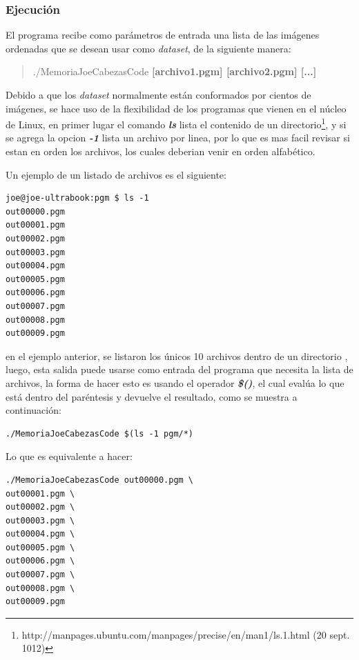 \subsubsection{Ejecución}
\label{ch:propuesta:sec:extraccionDeLaSuperficie:subsec:ejecucion}

El programa recibe como parámetros de entrada una lista de las imágenes ordenadas que se desean usar como \emph{dataset}, de la siguiente manera:

\begin{quote}
./MemoriaJoeCabezasCode \textbf{[archivo1.pgm] [archivo2.pgm] [...]}
\end{quote}

Debido a que los \emph{dataset} normalmente están conformados por cientos de imágenes, se hace uso de la flexibilidad de los programas que vienen en el núcleo de Linux, en primer lugar el comando \textbf{\emph{ls}} lista el contenido de un directorio\footnote{http://manpages.ubuntu.com/manpages/precise/en/man1/ls.1.html (20 sept. 1012)}, y si se agrega la opcion \textbf{\emph{-1}} lista un archivo por linea, por lo que es mas facil revisar si estan en orden los archivos, los cuales deberian venir en orden alfabético.

Un ejemplo de un listado de archivos es el siguiente:

\begin{verbatim}
joe@joe-ultrabook:pgm $ ls -1
out00000.pgm
out00001.pgm
out00002.pgm
out00003.pgm
out00004.pgm
out00005.pgm
out00006.pgm
out00007.pgm
out00008.pgm
out00009.pgm
\end{verbatim}

en el ejemplo anterior, se listaron los únicos 10 archivos dentro de un directorio , luego, esta salida puede usarse como entrada del programa que necesita la lista de archivos, la forma de hacer esto es usando el operador \textbf{\emph{\$()}}, el cual evalúa lo que está dentro del paréntesis y devuelve el resultado, como se muestra a continuación:

\begin{verbatim}
./MemoriaJoeCabezasCode $(ls -1 pgm/*)
\end{verbatim}

Lo que es equivalente a hacer:

\begin{verbatim}
./MemoriaJoeCabezasCode out00000.pgm \
out00001.pgm \
out00002.pgm \
out00003.pgm \
out00004.pgm \
out00005.pgm \
out00006.pgm \
out00007.pgm \
out00008.pgm \
out00009.pgm
\end{verbatim}

